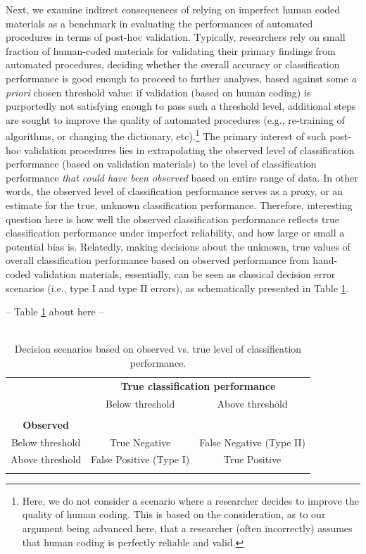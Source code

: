 \documentclass[man, 12pt, a4paper, nolmodern, noextraspace]{apa6}
\begin{document}
Next, we examine indirect consequences of relying on imperfect human coded materials as a benchmark in evaluating the performances of automated procedures in terms of post-hoc validation. Typically, researchers rely on  small fraction of human-coded materials for validating their primary findings from automated procedures, deciding whether the overall accuracy or classification performance is good enough to proceed to further analyses, based against some \textit{a priori} chosen threshold value: if validation (based on human coding) is purportedly not satisfying enough to pass such a threshold level, additional steps are sought to improve the quality of automated procedures (e.g., re-training of algorithms, or changing the dictionary, etc).\footnote{Here, we do not consider a scenario where a researcher decides to improve the quality of human coding. This is based on the consideration, as to our argument being advanced here, that a researcher (often incorrectly) assumes that human coding is perfectly reliable and valid.} The primary interest of such post-hoc validation procedures lies in extrapolating the observed level of classification performance (based on validation materials) to the level of classification performance \textit{that could have been observed} based on entire range of data. In other words, the observed level of classification performance serves as a proxy, or an estimate for the true, unknown classification performance. Therefore, interesting question here is how well the observed classification performance reflects true classification performance under imperfect reliability, and how large or small a potential bias is. Relatedly, making decisions about the unknown, true values of overall classification performance based on observed performance from hand-coded validation materials, essentially, can be seen as classical decision error scenarios (i.e., type I and type II errors), as schematically presented in Table \ref{tab:Table1}.
\centerline{ -- Table \ref{tab:Table1} about here -- }    

\begin{table}[!htbp] \centering 
  \begin{minipage}{1.1\textwidth}
    \centering
  \caption{\\ Decision scenarios based on observed vs. true level of classification performance.} 
  \label{tab:Table1} 
        \centering
  \begin{tabular}{ ccc}
\toprule
      \multicolumn{1}{c}{} &
      \multicolumn{2}{c}{\textbf{True classification performance}} \\
\cline{2-3}
 & Below threshold & Above threshold \\
\hline \\[-1.8ex] 
  \textbf{Observed} & & \\  
 Below threshold & True Negative & False Negative (Type II) \\ 
 Above threshold & False Positive (Type I) & True Positive \\ 
\hline \\[-1.8ex]  
  \end{tabular}
  \end{minipage}
\end{table} 
\end{document}
